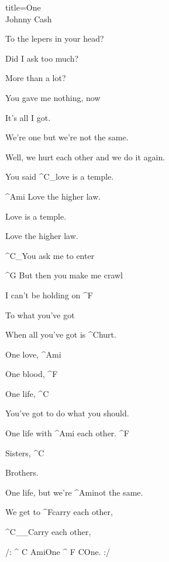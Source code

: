 \begin{song}{title=\centering One \\\normalsize Johnny Cash  \vspace*{-0.3cm}}
{\begin{minipage}[t]{0.55\textwidth}
	To the lepers in your head?


\end{minipage}\begin{minipage}[t]{0.55\textwidth}\setlength{\parindent}{0.45cm}\vspace*{0.55cm}  %


	Did I ask too much? 

	More than a lot?

	You gave me nothing, now
	   
	It's all I got.

	We're one but we're not the same.

	Well, we hurt each other and we do it again. 
 
	You said ^{C{\color{white}\_}}love is a temple.

	^{Ami\,\,}Love the higher law.

	Love is a temple.	

	Love the higher law.

	^{C{\color{white}\_}}You ask me to enter

	^{G\,\,}But then you make me crawl

	I can't be holding on ^{F}
                  
	To what you've got

	When all you've got is ^{C}hurt.
  
	One love, ^{Ami}

	One blood, ^{F}

	One life, ^{C}
 
	You've got to do what you should.

	One life with ^{Ami\,\,}each other. ^{F}
 
 	Sisters, ^{C}
 
	Brothers.
   
	One life, but we're ^{Ami}not the same.

	We get to ^{F}carry each other,

  	^{C{\color{white}\_\_}}Carry each other,

  	/: ^{\,\,C\,\,Ami}One ^{\,\,F\,\,C}One. :/


\normalsize


\end{minipage}
}
\setcounter{Slokočet}{0}
\end{song}
